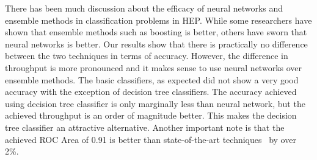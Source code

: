 There has been much discussion about the efficacy of neural networks and ensemble methods in classification problems in HEP. While some researchers have shown that ensemble methods such as boosting is better, others have sworn that neural networks is better. Our results show that there is practically no difference between the two techniques in terms of accuracy. However, the difference in throughput is more pronounced and it makes sense to use neural networks over ensemble methods. The basic classifiers, as expected  did not show a very good accuracy with the exception of decision tree classifiers. The accuracy achieved using decision tree classifier is only marginally less than neural network, but the achieved throughput is an order of magnitude better. This makes the decision tree classifier an attractive alternative. Another important note is that the achieved ROC Area of 0.91 is better than state-of-the-art techniques~\cite{DeepNN} by over 2\%.

